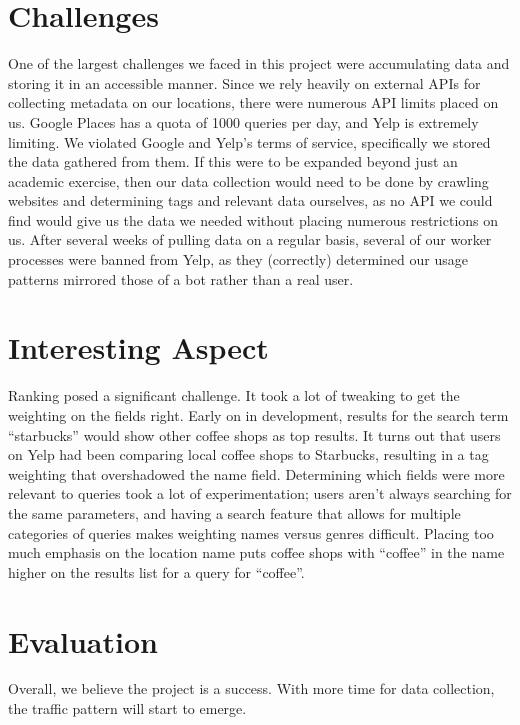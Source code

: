 \documentclass{article}
\begin{document}
\section{Challenges}
One of the largest challenges we faced in this project were accumulating data and storing it in an accessible manner. Since we rely heavily
on external APIs for collecting metadata on our locations, there were numerous API limits placed on us. Google Places has a quota of 1000 queries
per day, and Yelp is extremely limiting. We violated Google and Yelp's terms of service, specifically we stored the data gathered from them. 
If this were to be expanded beyond just an academic exercise, then our data collection would need to be done by crawling websites and determining
tags and relevant data ourselves, as no API we could find would give us the data we needed without placing numerous restrictions on us. After several
weeks of pulling data on a regular basis, several of our worker processes were banned from Yelp, as they (correctly) determined our usage
patterns mirrored those of a bot rather than a real user.

\section{Interesting Aspect}
Ranking posed a significant challenge. It took a lot of tweaking to get the weighting on the fields right. Early on in development, results for the
search term ``starbucks'' would show other coffee shops as top results. It turns out that users on Yelp had been comparing local coffee shops to
Starbucks, resulting in a tag weighting that overshadowed the name field. Determining which fields were more relevant to queries took a lot of
experimentation; users aren't always searching for the same parameters, and having a search feature that allows for multiple categories of queries
makes weighting names versus genres difficult. Placing too much emphasis on the location name puts coffee shops with ``coffee'' in the name higher
on the results list for a query for ``coffee''.

\section{Evaluation}
Overall, we believe the project is a success. With more time for data collection, the traffic pattern will start to emerge. %
\end{document}
